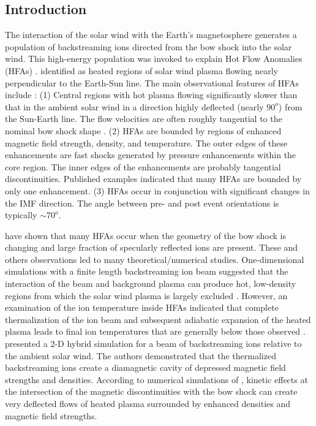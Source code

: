 \documentclass{article}
\begin{document}
\begin{article}

\section{Introduction}

The interaction of the solar wind with the Earth's magnetosphere
generates a population of backstreaming ions directed from the
bow shock into the solar wind. This high-energy population was
invoked to explain Hot Flow Anomalies (HFAs)
\citep[e.g.][]{sw}. \citet{th} identified as heated regions of solar wind plasma
flowing nearly perpendicular to the Earth-Sun line.
The main observational features of HFAs include \citep[and others]{sw}: (1) Central regions with hot plasma flowing
significantly slower than that in the ambient solar wind in a
direction highly deflected (nearly $90^o$) from the Sun-Earth line.
The flow velocities are often roughly tangential to the nominal
bow shock shape \citep{sw}.
(2) HFAs are bounded by regions of enhanced
magnetic field strength, density, and temperature. The outer
edges of these enhancements are fast shocks generated by
pressure enhancements within the core region. The inner
edges of the enhancements are probably  tangential
discontinuities.
Published examples indicated that  many HFAs are bounded by only
one enhancement.
(3) HFAs occur in conjunction with significant changes in the IMF
direction. The angle between pre- and post event orientations is
typically $\sim 70^o$.

\citet{th} have shown that many
HFAs occur when the geometry of the bow shock is changing and large fraction
of specularly reflected ions are present. These and others
observations led to many theoretical/numerical studies.
One-dimensional simulations with a finite length backstreaming
ion beam suggested
that the interaction of the beam and background plasma can produce hot,
low-density regions from which the solar wind plasma is largely
excluded \citep{onb}. However, an
examination of the ion temperature inside HFAs indicated that
complete thermalization of the ion beam and subsequent adiabatic
expansion of the heated plasma leads to final ion temperatures that
are generally below those observed \citep{ona}. \citet{kl} presented
a 2-D hybrid simulation for a beam of backstreaming ions
relative to the ambient solar wind. The authors demonstrated that
the thermalized backstreaming ions create a diamagnetic cavity of
depressed magnetic field  strengths and densities.
According to numerical simulations of \citet{kl, li}, kinetic effects at the intersection of the magnetic
discontinuities with the bow shock can create very deflected
flows of heated plasma surrounded by enhanced densities and
magnetic field strengths.


\end{article}
\end{document}
